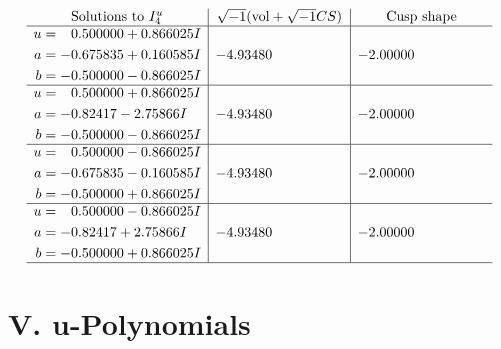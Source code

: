 \documentclass[1p]{elsarticle_modified}
\theoremstyle{definition}
\newcommand{\I}{\sqrt{-1}}
\begin{document}
$$\begin{array}{c|c|c}  
\text{Solutions to }I^u_{4}& \I (\text{vol} + \sqrt{-1}CS) & \text{Cusp shape}\\
 \hline 
\begin{aligned}
u &= \phantom{-}0.500000 + 0.866025 I \\
a &= -0.675835 + 0.160585 I \\
b &= -0.500000 - 0.866025 I\end{aligned}
 & -4.93480\phantom{ +0.000000I} & -2.00000\phantom{ +0.000000I} \\ \hline\begin{aligned}
u &= \phantom{-}0.500000 + 0.866025 I \\
a &= -0.82417 - 2.75866 I \\
b &= -0.500000 - 0.866025 I\end{aligned}
 & -4.93480\phantom{ +0.000000I} & -2.00000\phantom{ +0.000000I} \\ \hline\begin{aligned}
u &= \phantom{-}0.500000 - 0.866025 I \\
a &= -0.675835 - 0.160585 I \\
b &= -0.500000 + 0.866025 I\end{aligned}
 & -4.93480\phantom{ +0.000000I} & -2.00000\phantom{ +0.000000I} \\ \hline\begin{aligned}
u &= \phantom{-}0.500000 - 0.866025 I \\
a &= -0.82417 + 2.75866 I \\
b &= -0.500000 + 0.866025 I\end{aligned}
 & -4.93480\phantom{ +0.000000I} & -2.00000\phantom{ +0.000000I}\\
 \hline 
 \end{array}$$\newpage
\newpage\renewcommand{\arraystretch}{1}
\centering \section*{ V. u-Polynomials}
\end{document}
